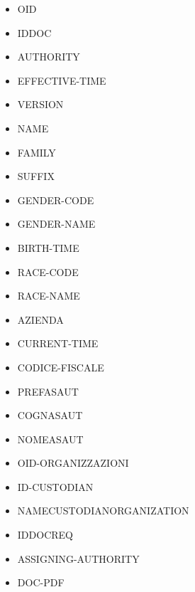 \begin{itemize}
    \setlength\itemsep{1mm}
    \item OID
    \item IDDOC
    \item AUTHORITY
    \item EFFECTIVE-TIME
    \item VERSION
    \item NAME
    \item FAMILY
    \item SUFFIX
    \item GENDER-CODE
    \item GENDER-NAME
    \item BIRTH-TIME
    \item RACE-CODE
    \item RACE-NAME
    \item AZIENDA
    \item CURRENT-TIME
    \item CODICE-FISCALE
    \item PREFASAUT
    \item COGNASAUT
    \item NOMEASAUT
    \item OID-ORGANIZZAZIONI
    \item ID-CUSTODIAN
    \item NAMECUSTODIANORGANIZATION
    \item IDDOCREQ
    \item ASSIGNING-AUTHORITY
    \item DOC-PDF
\end{itemize}



